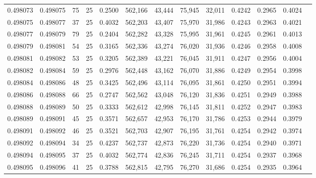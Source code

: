 \begin{tabular}{rrrrrrrrrrrrr}
0.498073 & 0.498075 &    75 &  25 &                                     0.2500 & 562,166 &  43,444 &  75,945 &  32,011 & 0.4242 & 0.2965 & 0.4024 \\
0.498075 & 0.498077 &    37 &  25 &                                     0.4032 & 562,203 &  43,407 &  75,970 &  31,986 & 0.4243 & 0.2963 & 0.4021 \\
0.498077 & 0.498079 &    79 &  25 &                                     0.2404 & 562,282 &  43,328 &  75,995 &  31,961 & 0.4245 & 0.2961 & 0.4013 \\
0.498079 & 0.498081 &    54 &  25 &                                     0.3165 & 562,336 &  43,274 &  76,020 &  31,936 & 0.4246 & 0.2958 & 0.4008 \\
0.498081 & 0.498082 &    53 &  25 &                                     0.3205 & 562,389 &  43,221 &  76,045 &  31,911 & 0.4247 & 0.2956 & 0.4004 \\
0.498082 & 0.498084 &    59 &  25 &                                     0.2976 & 562,448 &  43,162 &  76,070 &  31,886 & 0.4249 & 0.2954 & 0.3998 \\
0.498084 & 0.498086 &    48 &  25 &                                     0.3425 & 562,496 &  43,114 &  76,095 &  31,861 & 0.4250 & 0.2951 & 0.3994 \\
0.498086 & 0.498088 &    66 &  25 &                                     0.2747 & 562,562 &  43,048 &  76,120 &  31,836 & 0.4251 & 0.2949 & 0.3988 \\
0.498088 & 0.498089 &    50 &  25 &                                     0.3333 & 562,612 &  42,998 &  76,145 &  31,811 & 0.4252 & 0.2947 & 0.3983 \\
0.498089 & 0.498091 &    45 &  25 &                                     0.3571 & 562,657 &  42,953 &  76,170 &  31,786 & 0.4253 & 0.2944 & 0.3979 \\
0.498091 & 0.498092 &    46 &  25 &                                     0.3521 & 562,703 &  42,907 &  76,195 &  31,761 & 0.4254 & 0.2942 & 0.3974 \\
0.498092 & 0.498094 &    34 &  25 &                                     0.4237 & 562,737 &  42,873 &  76,220 &  31,736 & 0.4254 & 0.2940 & 0.3971 \\
0.498094 & 0.498095 &    37 &  25 &                                     0.4032 & 562,774 &  42,836 &  76,245 &  31,711 & 0.4254 & 0.2937 & 0.3968 \\
0.498095 & 0.498096 &    41 &  25 &                                     0.3788 & 562,815 &  42,795 &  76,270 &  31,686 & 0.4254 & 0.2935 & 0.3964 \\

\end{tabular}
